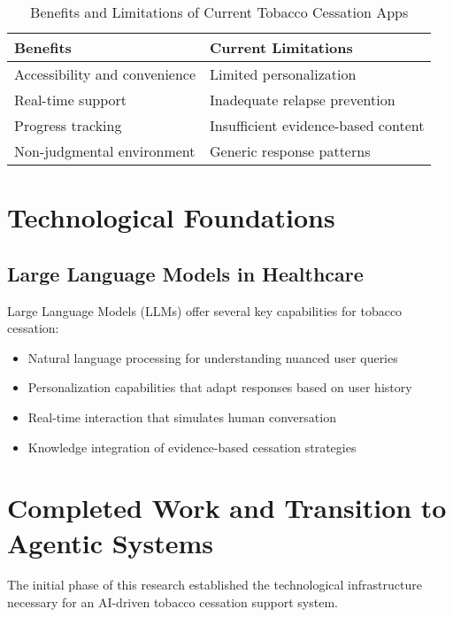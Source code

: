 \begin{table}[h]
    \centering
    \begin{tabular}{|>{}p{5cm}|>{}p{5cm}|}
        \hline
        \rowcolor{gray!15} \textbf{Benefits} & \textbf{Current Limitations} \\
        \hline
        Accessibility and convenience & Limited personalization \\
        \hline
        Real-time support & Inadequate relapse prevention \\
        \hline
        Progress tracking & Insufficient evidence-based content \\
        \hline
        Non-judgmental environment & Generic response patterns \\
        \hline
    \end{tabular}
    \caption{Benefits and Limitations of Current Tobacco Cessation Apps}
    \label{tab:mhealth_comparison}
\end{table}

\section{Technological Foundations}

\subsection{Large Language Models in Healthcare}

Large Language Models (LLMs) offer several key capabilities for tobacco cessation:

\begin{itemize}
    \item Natural language processing for understanding nuanced user queries
    \item Personalization capabilities that adapt responses based on user history
    \item Real-time interaction that simulates human conversation
    \item Knowledge integration of evidence-based cessation strategies
\end{itemize}

\section{Completed Work and Transition to Agentic Systems}

The initial phase of this research established the technological infrastructure necessary for an AI-driven tobacco cessation support system.

